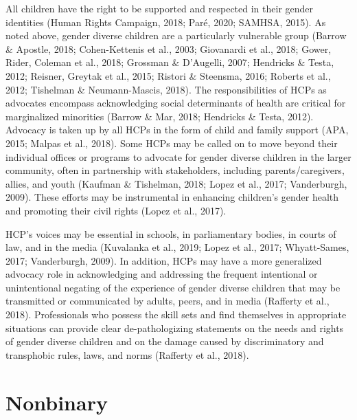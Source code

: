 \documentclass[
]{book}
\begin{document}
All children have the right to be supported
and respected in their gender identities (Human
Rights Campaign, 2018; Paré, 2020; SAMHSA,
2015). As noted above, gender diverse children
are a particularly vulnerable group (Barrow \&
Apostle, 2018; Cohen-Kettenis et al., 2003;
Giovanardi et al., 2018; Gower, Rider, Coleman
et al., 2018; Grossman \& D'Augelli, 2007;
Hendricks \& Testa, 2012; Reisner, Greytak et al.,
2015; Ristori \& Steensma, 2016; Roberts et al.,
2012; Tishelman \& Neumann-Mascis, 2018). The
responsibilities of HCPs as advocates encompass
acknowledging social determinants of health are
critical for marginalized minorities (Barrow \&
Mar, 2018; Hendricks \& Testa, 2012). Advocacy
is taken up by all HCPs in the form of child and
family support (APA, 2015; Malpas et al., 2018).
Some HCPs may be called on to move beyond
their individual offices or programs to advocate
for gender diverse children in the larger community, often in partnership with stakeholders,
including parents/caregivers, allies, and youth
(Kaufman \& Tishelman, 2018; Lopez et al., 2017;
Vanderburgh, 2009). These efforts may be instrumental in enhancing children's gender health and
promoting their civil rights (Lopez et al., 2017).

HCP's voices may be essential in schools, in
parliamentary bodies, in courts of law, and in
the media (Kuvalanka et al., 2019; Lopez et al.,
2017; Whyatt-Sames, 2017; Vanderburgh, 2009).
In addition, HCPs may have a more generalized
advocacy role in acknowledging and addressing
the frequent intentional or unintentional negating of the experience of gender diverse children
that may be transmitted or communicated by
adults, peers, and in media (Rafferty et al.,
2018). Professionals who possess the skill sets
and find themselves in appropriate situations
can provide clear de-pathologizing statements
on the needs and rights of gender diverse children and on the damage caused by discriminatory and transphobic rules, laws, and norms
(Rafferty et al., 2018).

\hypertarget{nonbinary}{%
\chapter{Nonbinary}\label{nonbinary}}
\end{document}
